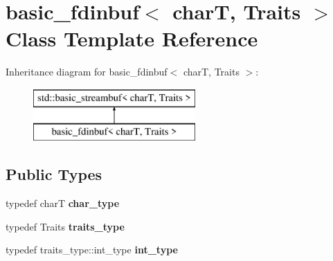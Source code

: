 \hypertarget{classbasic__fdinbuf}{\section{basic\-\_\-fdinbuf$<$ char\-T, Traits $>$ Class Template Reference}
\label{classbasic__fdinbuf}
}
Inheritance diagram for basic\-\_\-fdinbuf$<$ char\-T, Traits $>$\-:\begin{figure}[H]
\begin{center}
\leavevmode
\includegraphics[height=2.000000cm]{classbasic__fdinbuf}
\end{center}
\end{figure}
\subsection*{Public Types}
\begin{DoxyCompactItemize}
\item 
\hypertarget{classbasic__fdinbuf_a608effca13d9fb056b9f359e1178bfeb}{typedef char\-T {\bfseries char\-\_\-type}}\label{classbasic__fdinbuf_a608effca13d9fb056b9f359e1178bfeb}

\item 
\hypertarget{classbasic__fdinbuf_a4a1e6cd5287198cda443eae8f37947c0}{typedef Traits {\bfseries traits\-\_\-type}}\label{classbasic__fdinbuf_a4a1e6cd5287198cda443eae8f37947c0}

\item 
\hypertarget{classbasic__fdinbuf_a30adf4478fe081ce52acfdc2ed2b13c1}{typedef traits\-\_\-type\-::int\-\_\-type {\bfseries int\-\_\-type}}\label{classbasic__fdinbuf_a30adf4478fe081ce52acfdc2ed2b13c1}

\end{DoxyCompactItemize}
